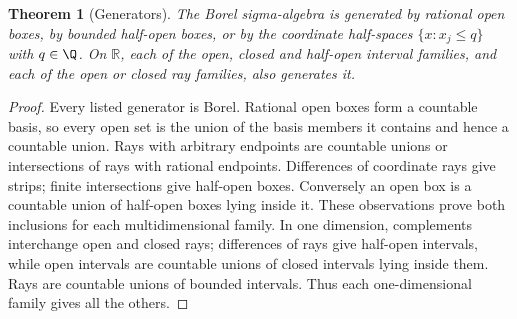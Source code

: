 \documentclass[11pt,oneside,openany]{book}
\newtheorem{theorem}{Theorem}[chapter]
\theoremstyle{definition}
\theoremstyle{remark}
\newcommand{\R}{\mathbb R}\newcommand{\C}{\mathbb C}
\newcommand{\family}[1]{}
\begin{document}
\begin{theorem}[Generators]
\family{D11.03.borel_generators}\label{d11:03:borel-generators}
The Borel sigma-algebra is generated by rational open boxes, by bounded
half-open boxes, or by the coordinate half-spaces $\{x:x_j\leq q\}$ with
$q\in\Q$. On $\R$, each of the open, closed and half-open interval families,
and each of the open or closed ray families, also generates it.
\end{theorem}
\begin{proof}
Every listed generator is Borel. Rational open boxes form a countable basis,
so every open set is the union of the basis members it contains and hence a
countable union. Rays with arbitrary endpoints are countable unions or
intersections of rays with rational endpoints. Differences of coordinate rays
give strips; finite intersections give half-open boxes. Conversely an open
box is a countable union of half-open boxes lying inside it. These observations
prove both inclusions for each multidimensional family. In one dimension,
complements interchange open and closed rays; differences of rays give
half-open intervals, while open intervals are countable unions of closed
intervals lying inside them. Rays are countable unions of bounded intervals.
Thus each one-dimensional family gives all the others.
\end{proof}
\end{document}
